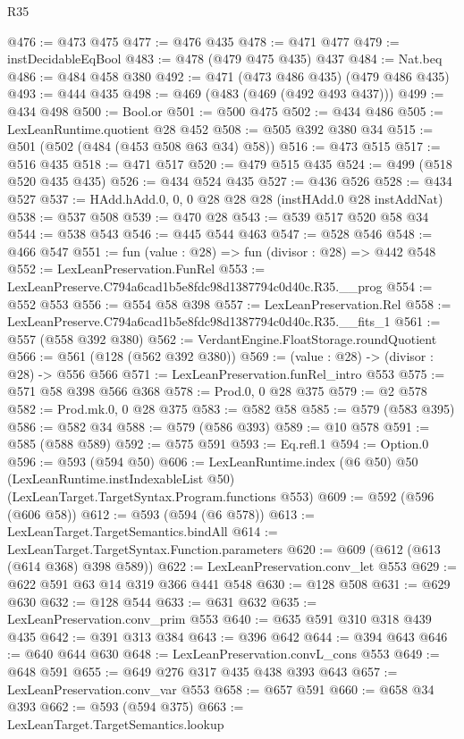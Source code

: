 \begin{lexlean}{R35}
\begin{coremodule}
@476 := @473 @475
@477 := @476 @435
@478 := @471 @477
@479 := instDecidableEqBool
@483 := @478 (@479 @475 @435) @437
@484 := Nat.beq
@486 := @484 @458 @380
@492 := @471 (@473 @486 @435) (@479 @486 @435)
@493 := @444 @435
@498 := @469 (@483 (@469 (@492 @493 @437)))
@499 := @434 @498
@500 := Bool.or
@501 := @500 @475
@502 := @434 @486
@505 := LexLeanRuntime.quotient @28 @452
@508 := @505 @392 @380 @34
@515 := @501 (@502 (@484 (@453 @508 @63 @34) @58))
@516 := @473 @515
@517 := @516 @435
@518 := @471 @517
@520 := @479 @515 @435
@524 := @499 (@518 @520 @435 @435)
@526 := @434 @524 @435
@527 := @436 @526
@528 := @434 @527
@537 := HAdd.hAdd.{0, 0, 0} @28 @28 @28 (instHAdd.{0} @28 instAddNat)
@538 := @537 @508
@539 := @470 @28
@543 := @539 @517 @520 @58 @34
@544 := @538 @543
@546 := @445 @544 @463
@547 := @528 @546
@548 := @466 @547
@551 := fun (value : @28) => fun (divisor : @28) => @442 @548
@552 := LexLeanPreservation.FunRel
@553 := LexLeanPreserve.C794a6cad1b5e8fdc98d1387794c0d40c.R35.__prog
@554 := @552 @553
@556 := @554 @58 @398
@557 := LexLeanPreservation.Rel
@558 := LexLeanPreserve.C794a6cad1b5e8fdc98d1387794c0d40c.R35.__fits_1
@561 := @557 (@558 @392 @380)
@562 := VerdantEngine.FloatStorage.roundQuotient
@566 := @561 (@128 (@562 @392 @380))
@569 := (value : @28) -> (divisor : @28) -> @556 @566
@571 := LexLeanPreservation.funRel_intro @553
@575 := @571 @58 @398 @566 @368
@578 := Prod.{0, 0} @28 @375
@579 := @2 @578
@582 := Prod.mk.{0, 0} @28 @375
@583 := @582 @58
@585 := @579 (@583 @395)
@586 := @582 @34
@588 := @579 (@586 @393)
@589 := @10 @578
@591 := @585 (@588 @589)
@592 := @575 @591
@593 := Eq.refl.{1}
@594 := Option.{0}
@596 := @593 (@594 @50)
@606 := LexLeanRuntime.index
    (@6 @50)
    @50
    (LexLeanRuntime.instIndexableList @50)
    (LexLeanTarget.TargetSyntax.Program.functions @553)
@609 := @592 (@596 (@606 @58))
@612 := @593 (@594 (@6 @578))
@613 := LexLeanTarget.TargetSemantics.bindAll
@614 := LexLeanTarget.TargetSyntax.Function.parameters
@620 := @609 (@612 (@613 (@614 @368) @398 @589))
@622 := LexLeanPreservation.conv_let @553
@629 := @622 @591 @63 @14 @319 @366 @441 @548
@630 := @128 @508
@631 := @629 @630
@632 := @128 @544
@633 := @631 @632
@635 := LexLeanPreservation.conv_prim @553
@640 := @635 @591 @310 @318 @439 @435
@642 := @391 @313 @384
@643 := @396 @642
@644 := @394 @643
@646 := @640 @644 @630
@648 := LexLeanPreservation.convL_cons @553
@649 := @648 @591
@655 := @649 @276 @317 @435 @438 @393 @643
@657 := LexLeanPreservation.conv_var @553
@658 := @657 @591
@660 := @658 @34 @393
@662 := @593 (@594 @375)
@663 := LexLeanTarget.TargetSemantics.lookup

\end{coremodule}
\end{lexlean}
